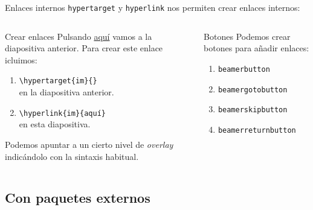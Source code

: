 \begin{frame}{Enlaces internos}
  \texttt{hypertarget} y \texttt{hyperlink} nos permiten crear enlaces internos:
  \espacio
  \begin{columns}
      \pause
      \begin{exampleblock}{Crear enlaces}
        Pulsando \hyperlink{im}{\color{links}aquí} vamos a la diapositiva anterior. Para
        crear este enlace icluimos:
        \begin{enumerate}
          \item \texttt{\textbackslash {\color{keywords}hypertarget}\{im\}\{\}} \\
          en la diapositiva anterior.
          \item \texttt{\textbackslash {\color{keywords}hyperlink}\{im\}\{aquí\}} \\
          en esta diapositiva.
        \end{enumerate}

        Podemos apuntar a un cierto nivel de \textit{overlay} indicándolo con la
        sintaxis habitual.
      \end{exampleblock}
      \pause
      \begin{exampleblock}{Botones}
        Podemos crear botones para añadir enlaces:
        \begin{enumerate}
          \item \texttt{beamerbutton}       \\ \href{https://www.youtube.com/watch?v=dQw4w9WgXcQ}{}
          \item \texttt{beamergotobutton}   \\ \hyperlink{graphs}{}
          \item \texttt{beamerskipbutton}   \\ \hyperlink{fin}{}
          \item \texttt{beamerreturnbutton} \\ \hyperlink{index}{}
        \end{enumerate}
      \end{exampleblock}
  \end{columns}
\end{frame}

\subsection{Con paquetes externos}


